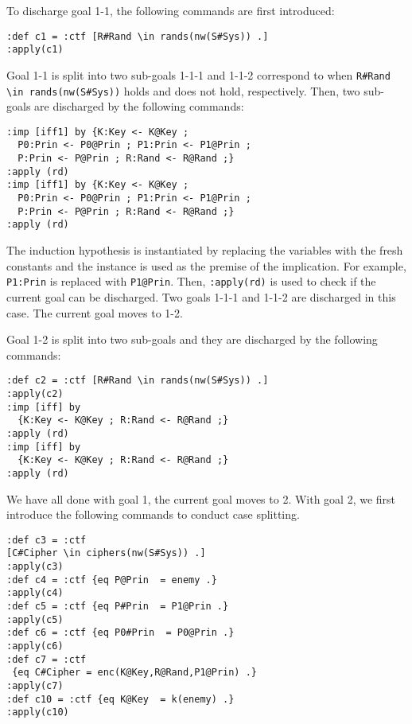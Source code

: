 \documentclass[10pt, conference, compsocconf]{IEEEtran}
\begin{document}
To discharge goal 1-1, the following commands are first introduced:
\begin{small}
	\begin{verbatim}
:def c1 = :ctf [R#Rand \in rands(nw(S#Sys)) .]
:apply(c1)
	\end{verbatim}
\end{small}

\noindent %
Goal 1-1 is split into two sub-goals 1-1-1 and 1-1-2 correspond to when \verb!R#Rand \in rands(nw(S#Sys))! holds and does not hold, respectively. Then, two sub-goals are discharged by the following commands:

\begin{small}
	\begin{verbatim}
:imp [iff1] by {K:Key <- K@Key ; 
  P0:Prin <- P0@Prin ; P1:Prin <- P1@Prin ; 
  P:Prin <- P@Prin ; R:Rand <- R@Rand ;}
:apply (rd)
:imp [iff1] by {K:Key <- K@Key ; 
  P0:Prin <- P0@Prin ; P1:Prin <- P1@Prin ; 
  P:Prin <- P@Prin ; R:Rand <- R@Rand ;}
:apply (rd)
	\end{verbatim}
\end{small}

\noindent
The induction hypothesis is instantiated by replacing the variables
with the fresh constants and the instance is used as the premise of the
implication. For example, \verb!P1:Prin! is replaced with \verb!P1@Prin!.
Then, \verb!:apply(rd)! is used to check if the current
goal can be discharged. Two goals 1-1-1 and 1-1-2 are discharged in this case.
The current goal moves to 1-2.

Goal 1-2 is split into two sub-goals and they are discharged by the following commands:

\begin{small}
	\begin{verbatim}
:def c2 = :ctf [R#Rand \in rands(nw(S#Sys)) .]
:apply(c2)
:imp [iff] by 
  {K:Key <- K@Key ; R:Rand <- R@Rand ;}
:apply (rd)
:imp [iff] by 
  {K:Key <- K@Key ; R:Rand <- R@Rand ;}
:apply (rd)
	\end{verbatim}
\end{small}

\noindent
We have all done with goal 1, the current goal moves to 2. With goal 2, we first introduce the following commands to conduct case splitting.

\begin{small}
	\begin{verbatim}
:def c3 = :ctf 
[C#Cipher \in ciphers(nw(S#Sys)) .]
:apply(c3)
:def c4 = :ctf {eq P@Prin  = enemy .}
:apply(c4)
:def c5 = :ctf {eq P#Prin  = P1@Prin .}
:apply(c5)
:def c6 = :ctf {eq P0#Prin  = P0@Prin .}
:apply(c6)
:def c7 = :ctf 
 {eq C#Cipher = enc(K@Key,R@Rand,P1@Prin) .}
:apply(c7)
:def c10 = :ctf {eq K@Key  = k(enemy) .}
:apply(c10)
	\end{verbatim}
\end{small}
\end{document}
